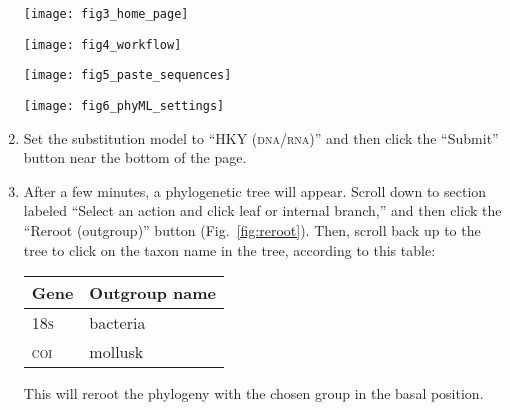 \documentclass[12pt, hidelinks]{exam}
\begin{document}
\begin{enumerate}
\begin{center}
	\texttt{[image: fig3\_home\_page]}
\end{center}

\vfill

\begin{center}
	\texttt{[image: fig4\_workflow]}
\end{center}


\newpage

\begin{center}
	\texttt{[image: fig5\_paste\_sequences]}
\end{center}

\bigskip

\bigskip

\begin{center}
	\texttt{[image: fig6\_phyML\_settings]}
\end{center}

	\item  Set the substitution model to “HKY{} (\textsc{dna/rna})” and then click the “Submit” button near the bottom of the page.

	\item After a few minutes, a phylogenetic tree will appear. Scroll down to section labeled “Select an action and click leaf or internal branch,” and then click the “Reroot (outgroup)” button (Fig.~\ref{fig:reroot}).  Then, scroll back up to the tree to click on the taxon name in the tree, according to this table:
	
	{\centering\begin{tabular}{@{}ll@{}}
		\toprule
		Gene &	Outgroup name\\
		\midrule
		18\textsc{s}	&  bacteria\\
		\textsc{coi}	& mollusk\\
		\bottomrule		
	\end{tabular}\par}
	
	This will reroot the phylogeny with the chosen group in the basal position.


\end{enumerate}
\end{document}
